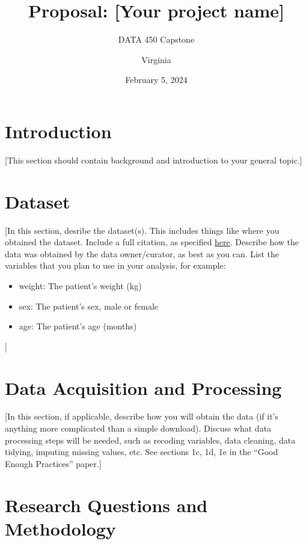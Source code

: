 \documentclass[
  letterpaper,
  DIV=11,
  numbers=noendperiod]{scrartcl}
\title{Proposal: {[}Your project name{]}}
\subtitle{DATA 450 Capstone}
\author{Virginia}
\date{February 5, 2024}
\providecommand{\tightlist}{%
  \setlength{\itemsep}{0pt}\setlength{\parskip}{0pt}}\usepackage{longtable,booktabs,array}
\begin{document}
\maketitle

\section{Introduction}\label{introduction}

{[}This section should contain background and introduction to your
general topic.{]}

\section{Dataset}\label{dataset}

{[}In this section, desribe the dataset(s). This includes things like
where you obtained the dataset. Include a full citation, as specified
\href{https://guides.lib.umich.edu/c.php?g=282964&p=3285995}{here}.
Describe how the data was obtained by the data owner/curator, as best as
you can. List the variables that you plan to use in your analysis, for
example:

\begin{itemize}
\tightlist
\item
  weight: The patient's weight (kg)
\item
  sex: The patient's sex, male or female
\item
  age: The patient's age (months)
\end{itemize}

{]}

\section{Data Acquisition and
Processing}\label{data-acquisition-and-processing}

{[}In this section, if applicable, describe how you will obtain the data
(if it's anything more complicated than a simple download). Discuss what
data processing steps will be needed, such as recoding variables, data
cleaning, data tidying, imputing missing values, etc. See sections 1c,
1d, 1e in the ``Good Enough Practices'' paper.{]}

\section{Research Questions and
Methodology}\label{research-questions-and-methodology}
\end{document}
